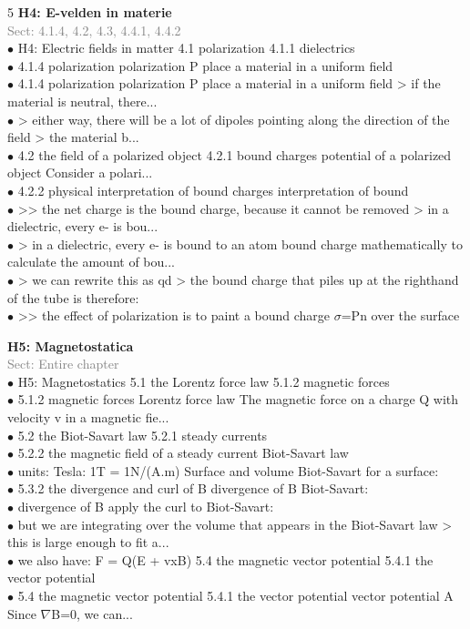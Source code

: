\documentclass[7pt,a4paper]{article}
\begin{document}
\begin{multicols*}{5}
\textbf{H4: E-velden in materie}\\\textcolor{gray}{{Sect: 4.1.4, 4.2, 4.3, 4.4.1, 4.4.2}}\\\vspace{0.5pt}
$\bullet$ H4: Electric fields in matter
4.1 polarization
4.1.1 dielectrics\\
$\bullet$ 4.1.4 polarization
polarization P place a material in a uniform field\\
$\bullet$ 4.1.4 polarization
polarization P place a material in a uniform field
> if the material is neutral, there...\\
$\bullet$ > either way, there will be a lot of dipoles pointing along the direction of the field
  > the material b...\\
$\bullet$ 4.2 the field of a polarized object
4.2.1 bound charges
potential of a polarized object Consider a polari...\\
$\bullet$ 4.2.2 physical interpretation of bound charges
interpretation of bound\\
$\bullet$ >> the net charge is the bound charge, because it cannot be removed
    > in a dielectric, every e- is bou...\\
$\bullet$ > in a dielectric, every e- is bound to an atom
bound charge mathematically to calculate the amount of bou...\\
$\bullet$ > we can rewrite this as qd
  > the bound charge that piles up at the righthand of the tube is therefore:\\
$\bullet$ >> the effect of polarization is to paint a bound charge $\sigma$=Pn over the surface\\
\columnbreak

\textbf{H5: Magnetostatica}\\\textcolor{gray}{{Sect: Entire chapter}}\\\vspace{0.5pt}
$\bullet$ H5: Magnetostatics
5.1 the Lorentz force law
5.1.2 magnetic forces\\
$\bullet$ 5.1.2 magnetic forces
Lorentz force law The magnetic force on a charge Q with velocity v in a magnetic fie...\\
$\bullet$ 5.2 the Biot-Savart law
5.2.1 steady currents\\
$\bullet$ 5.2.2 the magnetic field of a steady current
Biot-Savart law\\
$\bullet$ units: Tesla: 1T = 1N/(A.m)
Surface and volume Biot-Savart for a surface:\\
$\bullet$ 5.3.2 the divergence and curl of B
divergence of B  Biot-Savart:\\
$\bullet$ divergence of B apply the curl to Biot-Savart:\\
$\bullet$ but we are integrating over the volume that appears in the Biot-Savart law
> this is large enough to fit a...\\
$\bullet$ we also have: F = Q(E + vxB)
5.4 the magnetic vector potential
5.4.1 the vector potential\\
$\bullet$ 5.4 the magnetic vector potential
5.4.1 the vector potential
vector potential A Since $\nabla$B=0, we can...\\
\columnbreak


\end{multicols*}
\end{document}
